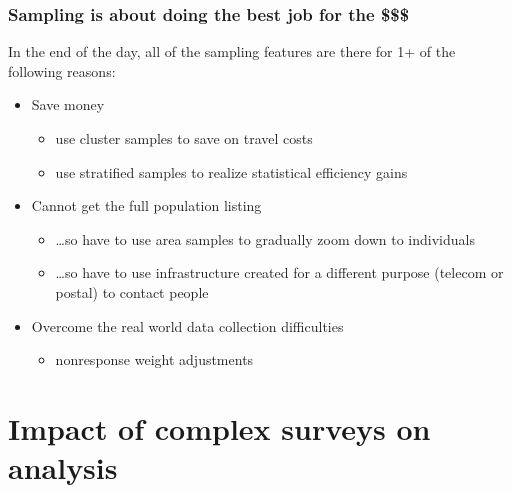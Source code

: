 \documentclass{beamer}
\begin{document}
\begin{frame}\frametitle{Sampling is about doing the best job for the \$\$\$}

In the end of the day, all of the sampling features are there for 1+ of the following reasons:

\begin{itemize}
    \item Save money
        \begin{itemize}
            \item use cluster samples to save on travel costs
            \item use stratified samples to realize statistical efficiency gains
        \end{itemize}
    \item Cannot get the full population listing
        \begin{itemize}
            \item \ldots so have to use area samples to gradually zoom down to individuals
            \item \ldots so have to use infrastructure created for a different purpose (telecom or postal) to contact people
        \end{itemize}
    \item Overcome the real world data collection difficulties
        \begin{itemize}
            \item nonresponse weight adjustments
        \end{itemize}
\end{itemize}

\end{frame}

\section{Impact of complex surveys on analysis}
\end{document}
